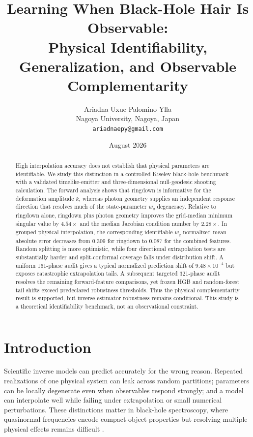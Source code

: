 \documentclass[10pt,twocolumn]{article}
\title{Learning When Black-Hole Hair Is Observable:\\Physical Identifiability, Generalization, and Observable Complementarity}
\author{Ariadna Uxue Palomino Ylla\\Nagoya University, Nagoya, Japan\\\texttt{ariadnaepy@gmail.com}}
\date{August 2026}
\newcommand{\wq}{w_q}
\begin{document}
\maketitle

\begin{abstract}
High interpolation accuracy does not establish that physical parameters are
identifiable. We study this distinction in a controlled Kiselev black-hole
benchmark with a validated timelike-emitter and three-dimensional null-geodesic
shooting calculation. The forward analysis shows that ringdown is informative
for the deformation amplitude $k$, whereas photon geometry supplies an
independent response direction that resolves much of the state-parameter
$\wq$ degeneracy. Relative to ringdown alone, ringdown plus photon geometry
improves the grid-median minimum singular value by $4.54\times$ and the median
Jacobian condition number by $2.28\times$. In grouped physical interpolation,
the corresponding identifiable-$\wq$ normalized mean absolute error decreases
from 0.309 for ringdown to 0.087 for the combined features. Random splitting is
more optimistic, while four directional extrapolation tests are substantially
harder and split-conformal coverage falls under distribution shift. A uniform
161-phase audit gives a typical normalized prediction shift of
$9.48\times10^{-4}$ but exposes catastrophic extrapolation tails. A subsequent
targeted 321-phase audit resolves the remaining forward-feature comparisons,
yet frozen HGB and random-forest tail shifts exceed predeclared robustness
thresholds. Thus the physical complementarity result is supported, but inverse
estimator robustness remains conditional. This study is a theoretical
identifiability benchmark, not an observational constraint.
\end{abstract}

\section{Introduction}
Scientific inverse models can predict accurately for the wrong reason. Repeated
realizations of one physical system can leak across random partitions;
parameters can be locally degenerate even when observables respond strongly;
and a model can interpolate well while failing under extrapolation or small
numerical perturbations. These distinctions matter in black-hole spectroscopy,
where quasinormal frequencies encode compact-object properties but resolving
multiple physical effects remains difficult \cite{dreyer2004spectroscopy,berti2006spectroscopy,bhagwat2019overtones}.
\end{document}
